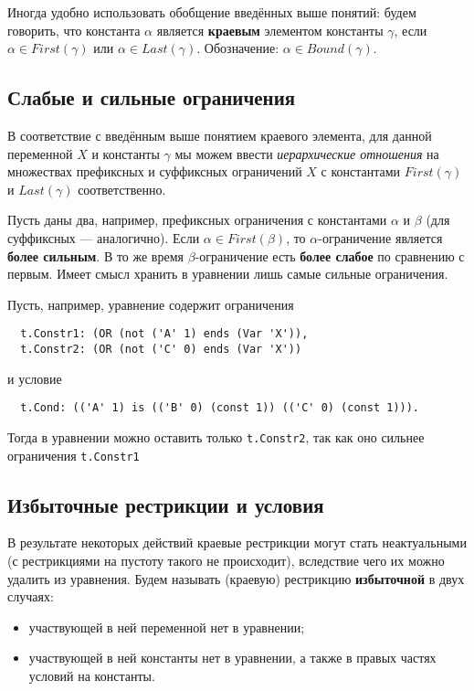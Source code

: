 \documentclass[12pt]{article}
\begin{document}
Иногда удобно использовать обобщение введённых выше понятий: будем
говорить, что константа $\alpha$ является \textbf{краевым} элементом константы
$\gamma$, если $\alpha \in First(\gamma)$ или $\alpha \in Last(\gamma)$.
Обозначение: $\alpha \in Bound(\gamma)$.

\subsection{Слабые и сильные ограничения}

В соответствие с введённым выше понятием краевого элемента, для данной
переменной $X$ и константы $\gamma$ мы можем ввести \textit{иерархические
отношения} на множествах префиксных и суффиксных ограничений $X$ с константами
$First(\gamma)$ и $Last(\gamma)$ соответственно.

Пусть даны два, например, префиксных ограничения с константами $\alpha$ и
$\beta$ (для суффиксных --- аналогично). Если $\alpha \in First(\beta)$, то
$\alpha$-ограничение является \textbf{более сильным}. В то же время
$\beta$-ограничение есть \textbf{более слабое} по сравнению с первым. Имеет
смысл хранить в уравнении лишь самые сильные ограничения.

Пусть, например, уравнение содержит ограничения
\begin{Verbatim}
  t.Constr1: (OR (not ('A' 1) ends (Var 'X')),
  t.Constr2: (OR (not ('C' 0) ends (Var 'X'))
\end{Verbatim}
и условие
\begin{Verbatim}
  t.Cond: (('A' 1) is (('B' 0) (const 1)) (('C' 0) (const 1))).
\end{Verbatim}
Тогда в уравнении можно оставить только \texttt{t.Constr2}, так как оно
сильнее ограничения \texttt{t.Constr1}

\subsection{Избыточные рестрикции и условия}

В результате некоторых действий краевые рестрикции могут стать неактуальными
(с рестрикциями на пустоту такого не происходит), вследствие чего их
можно удалить из уравнения. Будем называть (краевую) рестрикцию
\textbf{избыточной} в двух случаях:
\begin{itemize}
  \item участвующей в ней переменной нет в уравнении;
  \item участвующей в ней константы нет в уравнении, а также в правых частях
  условий на константы.
\end{itemize}
\end{document}
